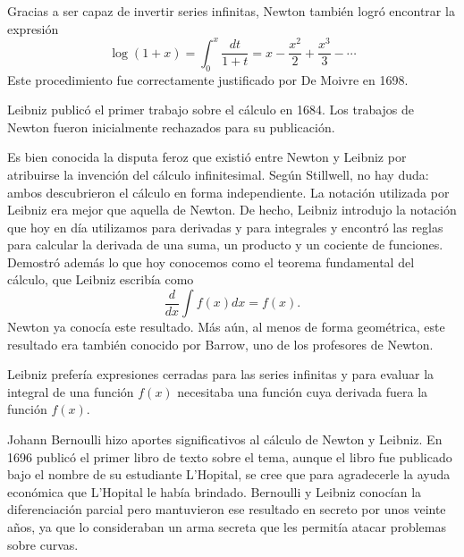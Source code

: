 Gracias a ser capaz de invertir series infinitas, Newton también logró encontrar la expresión
\[
	\log(1+x)=\int_0^x\dfrac{dt}{1+t}=x-\frac{x^2}{2}+\frac{x^3}{3}-\cdots
\]
Este procedimiento fue correctamente justificado por De Moivre en 1698.  

Leibniz publicó el primer trabajo sobre el cálculo en 1684. 
Los trabajos de Newton fueron inicialmente rechazados para su publicación. 

Es bien conocida la disputa feroz que existió entre Newton y Leibniz por atribuirse 
la invención del cálculo infinitesimal. 
Según Stillwell, no hay duda: ambos descubrieron el cálculo en forma
independiente. La notación utilizada por Leibniz era mejor que aquella de
Newton. De hecho, Leibniz introdujo la notación que hoy en día
utilizamos para derivadas y para integrales y encontró las reglas para calcular
la derivada de una suma, un producto y un cociente de funciones. Demostró
además lo que hoy conocemos como el teorema fundamental del cálculo, que
Leibniz escribía como
\[
	\frac{d}{dx}\int f(x)dx=f(x).
\]
Newton ya conocía este resultado. Más aún, al menos de forma geométrica, este resultado era también
conocido por Barrow, uno de los profesores de Newton. 

Leibniz prefería expresiones cerradas para las series infinitas y para evaluar la integral 
de una función $f(x)$ necesitaba una función cuya derivada fuera la función $f(x)$. 

Johann Bernoulli hizo aportes significativos al cálculo de Newton y Leibniz. En 1696 publicó el primer libro de texto sobre el tema, aunque 
el libro fue publicado bajo el nombre de su estudiante L'Hopital, se cree que 
para agradecerle la ayuda económica que L'Hopital le había brindado. Bernoulli y Leibniz conocían la diferenciación parcial pero
mantuvieron ese resultado en secreto por unos veinte años, ya que lo consideraban un arma secreta que les permitía atacar problemas sobre curvas. 

